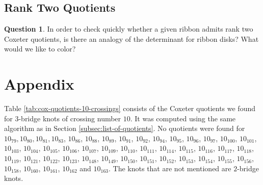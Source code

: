 \documentclass{article}
\theoremstyle{definition}
\newtheorem{question}[theorem]{Question}
\begin{document}
\subsection{Rank Two Quotients}

\begin{question}
In order to check quickly whether a given ribbon admits rank two Coxeter quotients, is there an analogy of the determinant for ribbon disks? What would we like to color?
\end{question}



\newpage

\appendix
\section{Appendix}\label{sec:data}
Table \ref{tab:cox-quotients-10-crossings} consists of the Coxeter quotients we found for $3$-bridge knots of crossing number $10$. It was computed using the same algorithm as in Section \ref{subsec:list-of-quotients}. No quotients were found for $10_{79}, 10_{80}, 10_{81}, 
10_{83}$, $10_{86}$, $10_{88}$, $10_{89}$, $10_{91}$, $10_{92}$, $10_{94}$, $10_{95}$, $10_{96}$, $10_{97}$,
$10_{100}$, $10_{101}$, $10_{103}$, $10_{104}$, $10_{105}$, $10_{106}$, $10_{107}$, $10_{109}$, $10_{110}$, $10_{111}$, $10_{114}$, $10_{115}$, $10_{116}$, $10_{117}$, $10_{118}$, $10_{119}$, $10_{121}$, $10_{122}$, $10_{123}$,
$10_{148}$, $10_{149}$, $10_{150}$, $10_{151}$, $10_{152}$, $10_{153}$, $10_{154}$, $10_{155}$, $10_{156}$, $10_{158}$,
$10_{160}$, $10_{161}$, $10_{162}$ and $10_{163}$. The knots that are not mentioned are $2$-bridge knots.
\end{document}

